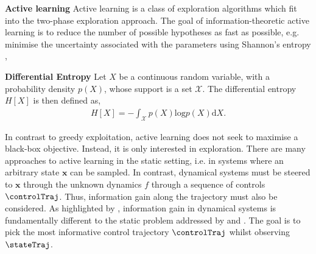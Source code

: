\documentclass{mimosis-class/mimosis}
\numberwithin{equation}{chapter}
\newcommand{\state}{\ensuremath{\mathbf{x}}}
\begin{document}
\textbf{Active learning}
Active learning is a class of exploration algorithms which fit into the two-phase exploration approach.
The goal of information-theoretic active learning is to reduce the number of
possible hypotheses as fast as possible, e.g. minimise the uncertainty associated
with the parameters using Shannon's entropy \citep{coverElements2006},
\newcommand{\crv}{\ensuremath{X}}
\newcommand{\density}{\ensuremath{p(\crv)}}
\begin{myquote}
\textbf{Differential Entropy}
Let $\crv$ be a continuous random variable, with a probability density
$\density$,
whose support is a set $\mathcal{X}$.
The differential entropy $H[\crv]$ is then defined as,
\begin{align} \label{eq-differential-entropy}
H[\crv] = - \int_{\mathcal{X}} \density \text{log} \density \text{d} \crv.
\end{align}
\end{myquote}
In contrast to greedy exploitation, active learning does not seek to maximise a
black-box objective. Instead, it is only interested in exploration. There are many
approaches to active learning in the static setting, i.e. in systems where an arbitrary
state \(\state\) can be sampled. In contrast, dynamical systems must be steered to \(\state\)
through the unknown dynamics \(f\) through a sequence of controls \(\controlTraj\). Thus,
information gain along the trajectory must also be considered. As highlighted
by \cite{buisson-fenetActively2020}, information gain in dynamical systems is
fundamentally different to the static problem addressed by \cite{krauseNearOptimal2008}  and
\cite{houlsbyBayesian2011}.
The goal is to pick the most informative control trajectory
\(\controlTraj\) whilst observing \(\stateTraj\).
\end{document}
